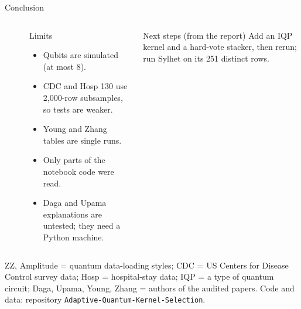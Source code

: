 \begin{frame}{Conclusion}
  \begin{columns}[T]
      \\[3pt]
      \\[3pt]

      \begin{block}{Limits}
        \scriptsize
        \begin{itemize}
          \item Qubits are simulated (at most 8).
          \item CDC and Hosp 130 use 2,000-row subsamples, so tests are weaker.
          \item Young and Zhang tables are single runs.
          \item Only parts of the notebook code were read.
          \item Daga and Upama explanations are untested; they need a Python machine.
        \end{itemize}
      \end{block}
      \begin{exampleblock}{Next steps (from the report)}
        \scriptsize Add an IQP kernel and a hard-vote stacker, then rerun; run Sylhet on its 251 distinct rows.
      \end{exampleblock}
  \end{columns}
  \vfill
  {\tiny ZZ, Amplitude = quantum data-loading styles; CDC = US Centers for Disease Control survey data; Hosp = hospital-stay data; IQP = a type of quantum circuit; Daga, Upama, Young, Zhang = authors of the audited papers. Code and data: repository \texttt{Adaptive-Quantum-Kernel-Selection}.}
\end{frame}
